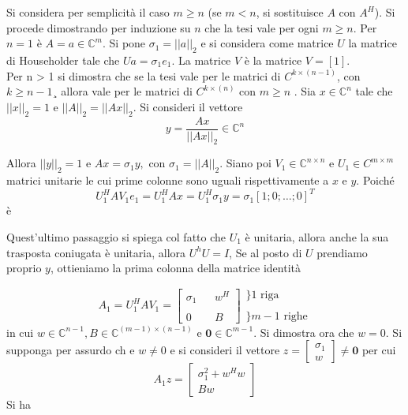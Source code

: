 \begin{thproof} Si considera per semplicit\`a il caso $m \geq n$ (se
$m < n$, si sostituisce $A$ con $A^H$). Si procede dimostrando per
induzione su $n$ che la tesi vale per ogni $m \geq n$.  Per $n = 1$
\`e $A = a \in \mathbb{C}^m$.  Si pone $\sigma_1 = ||a||_2$ e si
considera come matrice $U$ la matrice di Householder tale che $Ua =
\sigma_1e_1$. La matrice $V$ \`e la matrice $V = [1]$.  \\ Per n > 1
si dimostra che se la tesi vale per le matrici di $C^{k \times
(n-1)}$, con $k \geq n-1$¸ allora vale per le matrici di $C^{k \times
(n)}$ con $m \geq n$ . Sia $ x \in \mathbb{C}^{n}$ tale che $||x||_2 =
1 $ e $||A||_2 = ||Ax||_2$.  Si consideri il vettore
 $$y = \dfrac{Ax}{||Ax||_2} \in \mathbb{C}^{n}$$

Allora $||y||_2 = 1$ e $Ax = \sigma_1y,$ con $\sigma_1 =
||A||_2$. Siano poi $V_1 \in \mathbb{C}^{n \times n} $ e $U_1 \in C^{m
\times m}$ matrici unitarie le cui prime colonne sono uguali
rispettivamente a $x$ e $y$. Poich\'e
$$U_1^{H} AV_1e_1 = U_1^H Ax 
= U_1^{H} \sigma_1 y = \sigma_1[1; 0; \ldots ; 0]^T $$ \`e
\begin{notes}
Quest'ultimo passaggio si spiega col fatto
che $U_1$ \`e unitaria, allora anche la sua trasposta
coniugata \`e unitaria, allora $U^{h} U = I$, Se al posto
di $U$ prendiamo proprio $y$, ottieniamo la prima colonna
della matrice identit\`a
\end{notes}

$$
 A_1 = U_1^{H}AV_1 = \left[
\begin{array}{lll} \sigma_1 & & w^{H} \\ & & \\ 0 & & B
\end{array} \right]
\begin{array}{l} \}1 \text{ riga} \\ \\ \}m-1 \text{ righe}
\end{array}
$$
in cui $w \in \mathbb{C}^{n−1}, B \in \mathbb{C}^{(m−1)\times(n−1) }$
e $\mathbf{0} \in \mathbb{C}^{m−1}$.  Si dimostra ora che $w = 0$. Si
supponga per assurdo ch e $w \neq 0$ e si consideri il vettore $z =
\left[
 \begin{array}{l} \sigma_1 \\ w
\end{array} \right] \neq \mathbf{0} $ per cui
$$
A_1z = \left[
  \begin{array}{c} \sigma_1^{2} + w^{H}w \\ Bw
  \end{array} \right]
$$
 Si ha


\end{thproof}
